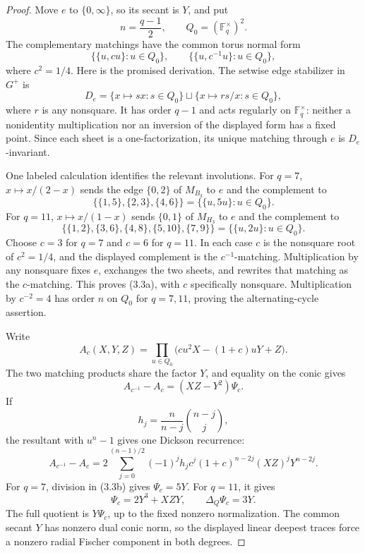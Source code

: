 \documentclass[11pt]{article}
\theoremstyle{definition}
\theoremstyle{remark}
\newcommand{\F}{\mathbb{F}}
\begin{document}
\begin{proof}
Move \(e\) to \(\{0,\infty\}\), so its secant is \(Y\), and put
\[
 n=\frac{q-1}{2},\qquad Q_0=(\F_q^\times)^2.
\]
The complementary matchings have the common torus normal form
\[
 \{\{u,cu\}:u\in Q_0\},\qquad
 \{\{u,c^{-1}u\}:u\in Q_0\},                         \tag{3.3a}
\]
where \(c^2=1/4\).  Here is the promised derivation.  The setwise edge
stabilizer in \(G^+\) is
\[
 D_e=\{x\mapsto sx:s\in Q_0\}
 \sqcup\{x\mapsto rs/x:s\in Q_0\},
\]
where \(r\) is any nonsquare.  It has order \(q-1\) and acts regularly on
\(\F_q^\times\): neither a nonidentity multiplication nor an inversion of
the displayed form has a fixed point.  Since each sheet is a
one-factorization, its unique matching through \(e\) is \(D_e\)-invariant.

One labeled calculation identifies the relevant involutions.  For \(q=7\),
\(x\mapsto x/(2-x)\) sends the edge \(\{0,2\}\) of \(M_{B_3}\) to \(e\) and
the complement to
\[
 \{\{1,5\},\{2,3\},\{4,6\}\}
 =\{\{u,5u\}:u\in Q_0\}.
\]
For \(q=11\), \(x\mapsto x/(1-x)\) sends \(\{0,1\}\) of \(M_{H_3}\) to
\(e\) and the complement to
\[
 \{\{1,2\},\{3,6\},\{4,8\},\{5,10\},\{7,9\}\}
 =\{\{u,2u\}:u\in Q_0\}.
\]
Choose \(c=3\) for \(q=7\) and \(c=6\) for \(q=11\).  In each case \(c\)
is the nonsquare root of \(c^2=1/4\), and the displayed complement is the
\(c^{-1}\)-matching.  Multiplication by any nonsquare fixes \(e\), exchanges
the two sheets, and rewrites that matching as the \(c\)-matching.  This
proves (3.3a), with \(c\) specifically nonsquare.  Multiplication by
\(c^{-2}=4\) has order \(n\) on \(Q_0\) for \(q=7,11\), proving the
alternating-cycle assertion.

Write
\[
 A_c(X,Y,Z)=
 \prod_{u\in Q_0}\bigl(cu^2X-(1+c)uY+Z\bigr).
\]
The two matching products share the factor \(Y\), and equality on the
conic gives
\[
 A_{c^{-1}}-A_c=(XZ-Y^2)\Psi_c.                         \tag{3.3b}
\]
If
\[
 h_j=\frac{n}{n-j}\binom{n-j}{j},
\]
the resultant with \(u^n-1\) gives one Dickson recurrence:
\[
 A_{c^{-1}}-A_c=
 2\sum_{j=0}^{(n-1)/2}
 (-1)^j h_jc^j(1+c)^{n-2j}(XZ)^jY^{n-2j}.              \tag{3.3c}
\]
For \(q=7\), division in (3.3b) gives
\(\Psi_c=5Y\).  For \(q=11\), it gives
\[
 \Psi_c=2Y^3+XZY,\qquad
 \Delta_Q\Psi_c=3Y.
\]
The full quotient is \(Y\Psi_c\), up to the fixed nonzero normalization.
The common secant \(Y\) has nonzero dual conic norm, so the displayed
linear deepest traces force a nonzero radial Fischer component in both
degrees.
\end{proof}
\end{document}
